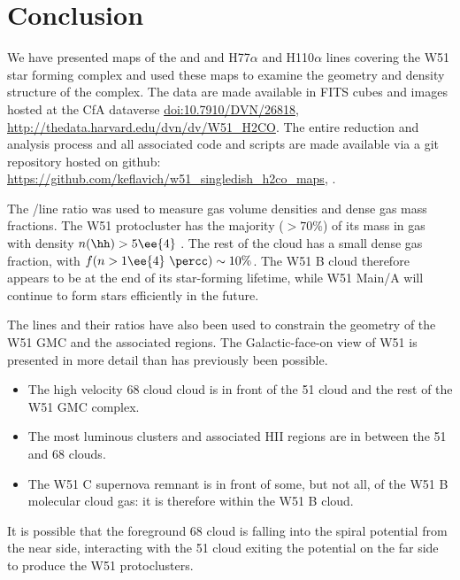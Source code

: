 \section{Conclusion}
\label{sec:conclusion}
We have presented maps of the \formaldehyde \oneone and \twotwo and H77$\alpha$
and H110$\alpha$ lines covering the W51 star forming complex and used these maps
to examine the geometry and density structure of the complex.  
The data are made available in FITS cubes and images hosted at the CfA
dataverse \url{doi:10.7910/DVN/26818},
\url{http://thedata.harvard.edu/dvn/dv/W51_H2CO}.
The entire reduction and analysis process and all associated code and scripts
are made available via a git
repository hosted on github:
\url{https://github.com/keflavich/w51_singledish_h2co_maps}, .






The \formaldehyde \oneone/\twotwo line ratio was used to measure gas volume
densities and dense gas mass fractions.  The W51 protocluster has the majority
($>70\%$) of its mass in gas with density $n(\hh)>5\ee{4}$ \percc.  The rest of
the cloud has a small dense gas fraction, with $f(n>1\ee{4}~\percc) \sim 10\%$.
The W51 B cloud therefore appears to be at the end of its star-forming
lifetime, while W51 Main/A will continue to form stars efficiently in the
future.

The \formaldehyde lines and their ratios have also been used to constrain the
geometry of the W51 GMC and the associated \hii regions.  The Galactic-face-on
view of W51 is presented in more detail than has previously been possible.
\begin{itemize}
    \item The high velocity 68 \kms cloud cloud is in front of the 51 \kms cloud
        and the rest of the W51 GMC complex.
    \item The most luminous clusters and associated HII regions are in between
        the 51 \kms and 68 \kms clouds.
    \item The W51 C supernova remnant is in front of some, but not all, of the 
        W51 B molecular cloud gas: it is therefore within the W51 B cloud.
\end{itemize}
It is possible that the foreground 68 \kms cloud is falling into the spiral
potential from the near side, interacting with the 51 \kms cloud exiting the
potential on the far side to produce the W51 protoclusters.  

